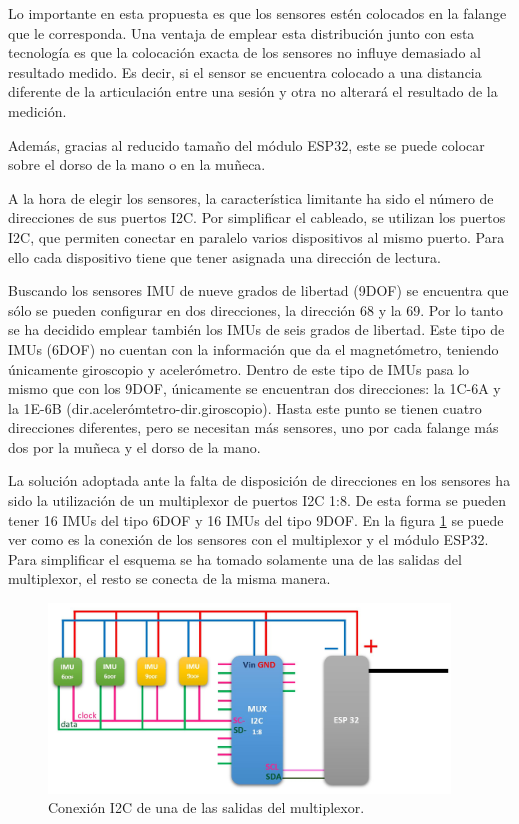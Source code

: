  Lo importante en esta propuesta es que los sensores estén colocados en la falange que le corresponda. Una ventaja de emplear esta distribución junto con esta tecnología es que la colocación exacta de los sensores no influye demasiado al resultado medido. Es decir, si el sensor se encuentra colocado a una distancia diferente de la articulación entre una sesión y otra no alterará el resultado de la medición.

Además, gracias al reducido tamaño del módulo ESP32, este se puede colocar sobre el dorso de la mano o en la muñeca. 

A la hora de elegir los sensores, la característica limitante ha sido el número de direcciones de sus puertos I2C. Por simplificar el cableado, se utilizan los puertos I2C, que permiten conectar en paralelo varios dispositivos al mismo puerto. Para ello cada dispositivo tiene que tener asignada una dirección de lectura. 

Buscando los sensores IMU de nueve grados de libertad (9DOF) se encuentra que sólo se pueden configurar en dos direcciones, la dirección 68 y la 69. Por lo tanto se ha decidido emplear también los IMUs de seis grados de libertad. Este tipo de IMUs (6DOF) no cuentan con la información que da el magnetómetro, teniendo únicamente giroscopio y acelerómetro. Dentro de este tipo de IMUs pasa lo mismo que con los 9DOF, únicamente se encuentran dos direcciones: la 1C-6A y la 1E-6B (dir.acelerómtetro-dir.giroscopio). Hasta este punto se tienen cuatro direcciones diferentes, pero se necesitan más sensores, uno por cada falange más dos por la muñeca y el dorso de la mano.

La solución adoptada ante la falta de disposición de direcciones en los sensores ha sido la utilización de un multiplexor de puertos I2C 1:8. De esta forma se pueden tener 16 IMUs del tipo 6DOF y 16 IMUs del tipo 9DOF. En la figura \ref{fig:esquemaimu} se puede ver como es la conexión de los sensores con el multiplexor y el módulo ESP32. Para simplificar el esquema se ha tomado solamente una de las salidas del multiplexor, el resto se conecta de la misma manera.

\begin{figure}[H]
	\centering
	\includegraphics[width=0.95\textwidth]{./img/esquemaimu}
	\caption{Conexión I2C de una de las salidas del multiplexor. } 
	\label{fig:esquemaimu}
\end{figure} 


